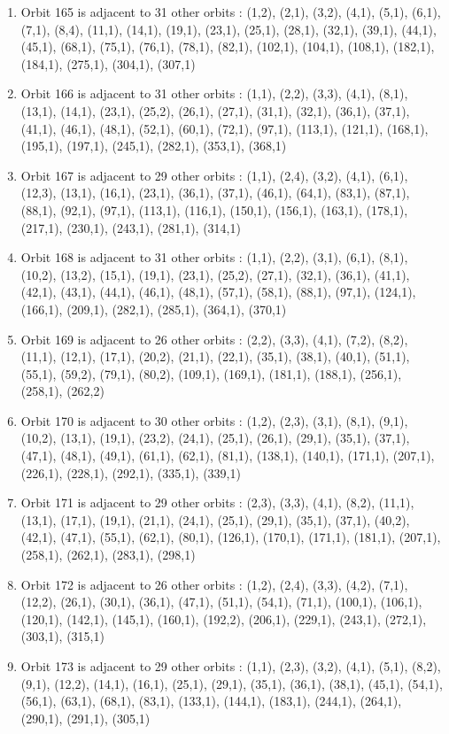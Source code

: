 \documentclass[12pt]{article}
\begin{document}
\begin{enumerate}
\item Orbit 165 is adjacent to 31 other orbits : (1,2), (2,1), (3,2), (4,1), (5,1), (6,1), (7,1), (8,4), (11,1), (14,1), (19,1), (23,1), (25,1), (28,1), (32,1), (39,1), (44,1), (45,1), (68,1), (75,1), (76,1), (78,1), (82,1), (102,1), (104,1), (108,1), (182,1), (184,1), (275,1), (304,1), (307,1)
\item Orbit 166 is adjacent to 31 other orbits : (1,1), (2,2), (3,3), (4,1), (8,1), (13,1), (14,1), (23,1), (25,2), (26,1), (27,1), (31,1), (32,1), (36,1), (37,1), (41,1), (46,1), (48,1), (52,1), (60,1), (72,1), (97,1), (113,1), (121,1), (168,1), (195,1), (197,1), (245,1), (282,1), (353,1), (368,1)
\item Orbit 167 is adjacent to 29 other orbits : (1,1), (2,4), (3,2), (4,1), (6,1), (12,3), (13,1), (16,1), (23,1), (36,1), (37,1), (46,1), (64,1), (83,1), (87,1), (88,1), (92,1), (97,1), (113,1), (116,1), (150,1), (156,1), (163,1), (178,1), (217,1), (230,1), (243,1), (281,1), (314,1)
\item Orbit 168 is adjacent to 31 other orbits : (1,1), (2,2), (3,1), (6,1), (8,1), (10,2), (13,2), (15,1), (19,1), (23,1), (25,2), (27,1), (32,1), (36,1), (41,1), (42,1), (43,1), (44,1), (46,1), (48,1), (57,1), (58,1), (88,1), (97,1), (124,1), (166,1), (209,1), (282,1), (285,1), (364,1), (370,1)
\item Orbit 169 is adjacent to 26 other orbits : (2,2), (3,3), (4,1), (7,2), (8,2), (11,1), (12,1), (17,1), (20,2), (21,1), (22,1), (35,1), (38,1), (40,1), (51,1), (55,1), (59,2), (79,1), (80,2), (109,1), (169,1), (181,1), (188,1), (256,1), (258,1), (262,2)
\item Orbit 170 is adjacent to 30 other orbits : (1,2), (2,3), (3,1), (8,1), (9,1), (10,2), (13,1), (19,1), (23,2), (24,1), (25,1), (26,1), (29,1), (35,1), (37,1), (47,1), (48,1), (49,1), (61,1), (62,1), (81,1), (138,1), (140,1), (171,1), (207,1), (226,1), (228,1), (292,1), (335,1), (339,1)
\item Orbit 171 is adjacent to 29 other orbits : (2,3), (3,3), (4,1), (8,2), (11,1), (13,1), (17,1), (19,1), (21,1), (24,1), (25,1), (29,1), (35,1), (37,1), (40,2), (42,1), (47,1), (55,1), (62,1), (80,1), (126,1), (170,1), (171,1), (181,1), (207,1), (258,1), (262,1), (283,1), (298,1)
\item Orbit 172 is adjacent to 26 other orbits : (1,2), (2,4), (3,3), (4,2), (7,1), (12,2), (26,1), (30,1), (36,1), (47,1), (51,1), (54,1), (71,1), (100,1), (106,1), (120,1), (142,1), (145,1), (160,1), (192,2), (206,1), (229,1), (243,1), (272,1), (303,1), (315,1)
\item Orbit 173 is adjacent to 29 other orbits : (1,1), (2,3), (3,2), (4,1), (5,1), (8,2), (9,1), (12,2), (14,1), (16,1), (25,1), (29,1), (35,1), (36,1), (38,1), (45,1), (54,1), (56,1), (63,1), (68,1), (83,1), (133,1), (144,1), (183,1), (244,1), (264,1), (290,1), (291,1), (305,1)

\end{enumerate}
\end{document}
